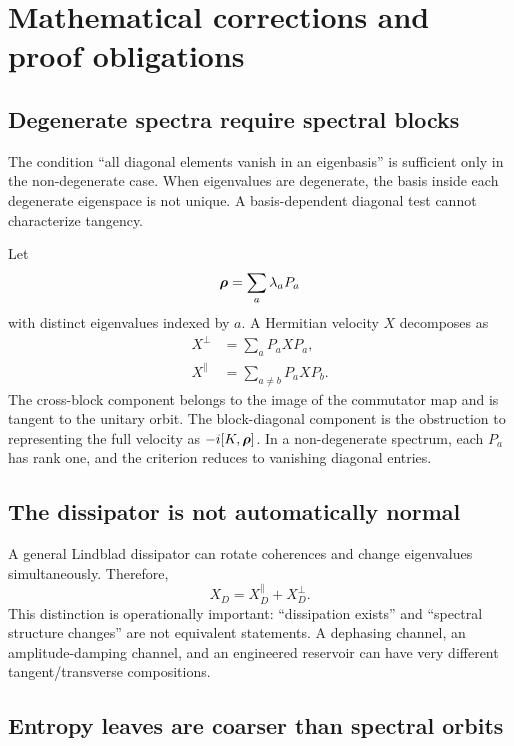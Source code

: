 \section{Mathematical corrections and proof obligations}

\subsection{Degenerate spectra require spectral blocks}

\begin{criticalbox}
The condition ``all diagonal elements vanish in an eigenbasis'' is sufficient only in the non-degenerate case. When eigenvalues are degenerate, the basis inside each degenerate eigenspace is not unique. A basis-dependent diagonal test cannot characterize tangency.
\end{criticalbox}

Let
\[
\bm{\rho}=\sum_a\lambda_a P_a
\]
with distinct eigenvalues indexed by $a$. A Hermitian velocity $X$ decomposes as
\begin{align}
X^{\perp} &= \sum_a P_a X P_a, \\
X^{\parallel} &= \sum_{a\neq b}P_a X P_b.
\label{eq:block_decomp}
\end{align}
The cross-block component belongs to the image of the commutator map and is tangent to the unitary orbit. The block-diagonal component is the obstruction to representing the full velocity as $-i[K,\bm{\rho}]$. In a non-degenerate spectrum, each $P_a$ has rank one, and the criterion reduces to vanishing diagonal entries.

\subsection{The dissipator is not automatically normal}

A general Lindblad dissipator can rotate coherences and change eigenvalues simultaneously. Therefore,
\[
X_D=X_D^{\parallel}+X_D^{\perp}.
\]
This distinction is operationally important: ``dissipation exists'' and ``spectral structure changes'' are not equivalent statements. A dephasing channel, an amplitude-damping channel, and an engineered reservoir can have very different tangent/transverse compositions.

\subsection{Entropy leaves are coarser than spectral orbits}


